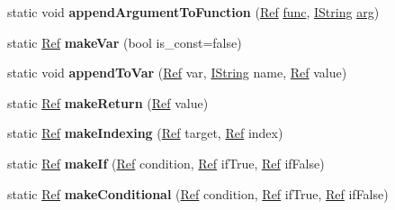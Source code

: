 \begin{DoxyCompactItemize}
static void {\bfseries append\+Argument\+To\+Function} (\mbox{\hyperlink{structcashew_1_1_ref}{Ref}} \mbox{\hyperlink{structfunc}{func}}, \mbox{\hyperlink{structcashew_1_1_i_string}{I\+String}} \mbox{\hyperlink{unionarg}{arg}})
\item 
\mbox{\label{classcashew_1_1_value_builder_a2d72430a3a77dea1b8ff3f72140d2845}} 
static \mbox{\hyperlink{structcashew_1_1_ref}{Ref}} {\bfseries make\+Var} (bool is\+\_\+const=false)
\item 
\mbox{\label{classcashew_1_1_value_builder_a400c1abc8af896e19c4a6da80caa672c}} 
static void {\bfseries append\+To\+Var} (\mbox{\hyperlink{structcashew_1_1_ref}{Ref}} var, \mbox{\hyperlink{structcashew_1_1_i_string}{I\+String}} name, \mbox{\hyperlink{structcashew_1_1_ref}{Ref}} value)
\item 
\mbox{\label{classcashew_1_1_value_builder_a3fb3025f1920e905d79084100d62b806}} 
static \mbox{\hyperlink{structcashew_1_1_ref}{Ref}} {\bfseries make\+Return} (\mbox{\hyperlink{structcashew_1_1_ref}{Ref}} value)
\item 
\mbox{\label{classcashew_1_1_value_builder_abb3825543725e96f4792685cb8f5c676}} 
static \mbox{\hyperlink{structcashew_1_1_ref}{Ref}} {\bfseries make\+Indexing} (\mbox{\hyperlink{structcashew_1_1_ref}{Ref}} target, \mbox{\hyperlink{structcashew_1_1_ref}{Ref}} index)
\item 
\mbox{\label{classcashew_1_1_value_builder_adcc5c76af89a9922b529ed1eced86a08}} 
static \mbox{\hyperlink{structcashew_1_1_ref}{Ref}} {\bfseries make\+If} (\mbox{\hyperlink{structcashew_1_1_ref}{Ref}} condition, \mbox{\hyperlink{structcashew_1_1_ref}{Ref}} if\+True, \mbox{\hyperlink{structcashew_1_1_ref}{Ref}} if\+False)
\item 
\mbox{\label{classcashew_1_1_value_builder_a8d241b6f355751cddb92f901496d13b8}} 
static \mbox{\hyperlink{structcashew_1_1_ref}{Ref}} {\bfseries make\+Conditional} (\mbox{\hyperlink{structcashew_1_1_ref}{Ref}} condition, \mbox{\hyperlink{structcashew_1_1_ref}{Ref}} if\+True, \mbox{\hyperlink{structcashew_1_1_ref}{Ref}} if\+False)
\item 

\end{DoxyCompactItemize}
